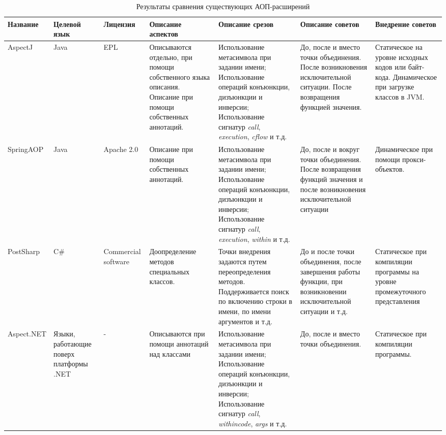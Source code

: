 \begin{sidewaystable}
\caption{Результаты сравнения существующих АОП-расширений}
\scriptsize
\begin{tabularx}{\textwidth}{|p{1.5cm}|p{1.5cm}|p{1.6cm}|p{1.7cm}|X|p{2cm}|p{1.7cm}|}
\hline
Название & Целевой язык & Лицензия & Описание аспектов & Описание срезов&Описание советов& Внедрение советов \\ \hline
AspectJ & Java & EPL & Описываются отдельно, при помощи собственного языка описания. Описание при помощи собственных аннотаций. & Использование метасимвола \quotes{*} при задании имени; Использование операций конъюнкции, дизъюнкции и инверсии; Использование сигнатур \textit{call}, \textit{execution}, \textit{cflow} и т.д. & До, после и вместо точки объединения. После возникновения исключительной ситуации. После возвращения функцией значения. & Статическое на уровне исходных кодов или байт-кода. Динамическое при загрузке классов в JVM. \\ \hline
SpringAOP & Java & Apache 2.0 & Описание при помощи собственных аннотаций. & Использование метасимвола \quotes{*} при задании имени; Использование операций конъюнкции, дизъюнкции и инверсии; Использование сигнатур \textit{call}, \textit{execution}, \textit{within} и т.д.  & До, после и вокруг точки объединения. После возвращения функций значения и после возникновения исключительной ситуации & Динамическое при помощи прокси-объектов. \\ \hline
PostSharp & C\# & Commercial software & Доопределение методов специальных классов. & Точки внедрения задаются путем переопределения методов. Поддерживается поиск по включению строки в имени, по имени аргументов и т.д.& До и после точки объединения, после завершения работы функции, при возникновении исключительной ситуации и т.д. & Статическое при компиляции программы на уровне промежуточного представления \\ \hline
Aspect.NET & Языки, работающие поверх платформы .NET & - & Описываются при помощи аннотаций над классами & Использование метасимвола \quotes{*} при задании имени; Использование операций конъюнкции, дизъюнкции и инверсии; Использование сигнатур \textit{call}, \textit{withincode}, \textit{args} и т.д. & До, после и вместо точки объединения. & Статическое при компиляции программы.\\ \hline
\end{tabularx}
\label{tab:comparison_results}
\end{sidewaystable}
